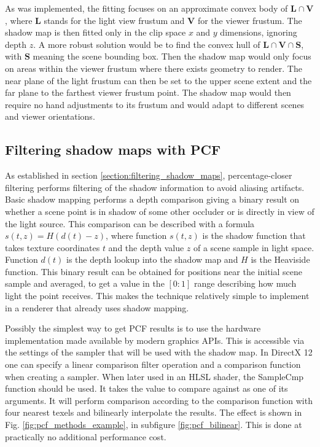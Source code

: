 As was implemented, the fitting focuses on an approximate convex body of \(\mathbf{L}\cap \mathbf{V}\), where \(\mathbf{L}\) stands for the light view frustum and \(\mathbf{V}\) for the viewer frustum. The shadow map is then fitted only in the clip space \(x\) and \(y\) dimensions, ignoring depth \(z\). A more robust solution would be to find the convex hull of \(\mathbf{L}\cap \mathbf{V}\cap \mathbf{S}\), with \(\mathbf{S}\) meaning the scene bounding box. Then the shadow map would only focus on areas within the viewer frustum where there exists geometry to render. The near plane of the light frustum can then be set to the upper scene extent and the far plane to the farthest viewer frustum point. The shadow map would then require no hand adjustments to its frustum and would adapt to different scenes and viewer orientations.

\subsection{Filtering shadow maps with PCF}
\label{section:pcf}
As established in section \ref{section:filtering_shadow_maps}, percentage-closer filtering performs filtering of the shadow information to avoid aliasing artifacts. Basic shadow mapping performs a depth comparison giving a binary result on whether a scene point is in shadow of some other occluder or is directly in view of the light source. This comparison can be described with a formula \(s(t, z) = H(d(t) - z)\), where function \(s(t, z)\) is the shadow function that takes texture coordinates \(t\) and the depth value \(z\) of a scene sample in light space. Function \(d(t)\) is the depth lookup into the shadow map and \(H\) is the Heaviside function. This binary result can be obtained for positions near the initial scene sample and averaged, to get a value in the \([0:1]\) range describing how much light the point receives. This makes the technique relatively simple to implement in a renderer that already uses shadow mapping.

Possibly the simplest way to get PCF results is to use the hardware implementation made available by modern graphics APIs. This is accessible via the settings of the sampler that will be used with the shadow map. In DirectX 12 one can specify a linear comparison filter operation and a comparison function when creating a sampler. When later used in an HLSL shader, the SampleCmp function should be used. It takes the value to compare against as one of its arguments. It will perform comparison according to the comparison function with four nearest texels and bilinearly interpolate the results. The effect is shown in Fig. \ref{fig:pcf_methods_example}, in subfigure \ref{fig:pcf_bilinear}. This is done at practically no additional performance cost.

